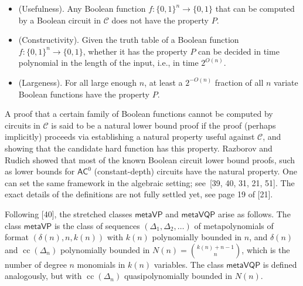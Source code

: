 \documentclass[10pt,a4paper]{article}
\begin{document}
\begin{itemize}


\item 
 


(Usefulness). Any Boolean function $f:\{0,1\}^{n}\rightarrow\{0,1\}$ that can be computed by a Boolean circuit in $\mathcal{C}$ does not have the property $P$.





\item 
 


(Constructivity). Given the truth table of a Boolean function $f:\{0,1\}^{n}\rightarrow\{0,1\}$, whether it has the property $P$ can be decided in time polynomial in the length of the input, i.e., in time $2^{O(n)}$.





\item 
 


(Largeness). For all large enough $n$, at least a $2^{-O(n)}$ fraction of all $n$ variate Boolean functions have the property $P$.





\end{itemize}





A proof that a certain family of Boolean functions cannot be computed by circuits in $\mathcal{C}$ is said to be a natural lower bound proof if the proof (perhaps implicitly) proceeds via establishing a natural property useful against $\mathcal{C}$, and showing that the candidate hard function has this property.
Razborov and Rudich showed that most of the known Boolean circuit lower bound proofs, such as lower bounds for $\mathsf{AC}^{0}$ (constant-depth) circuits have the natural property.
One can set the same framework in the algebraic setting; see [39, 40, 31, 21, 51]. The exact details of the definitions are not fully settled yet, see page 19 of [21].





Following [40], the stretched classes $\mathsf{metaVP}$ and $\mathsf{metaVQP}$ arise as follows.
The class $\mathsf{metaVP}$ is the class of sequences $(\Delta_{1},\Delta_{2},\ldots)$ of metapolynomials of format $(\delta(n),n,k(n))$ with $k(n)$ polynomially bounded in $n$, and $\delta(n)$ and $\operatorname{cc}(\Delta_{n})$ polynomially bounded in $N(n)=\binom{k(n)+n-1}{n}$, which is the number of degree $n$ monomials in $k(n)$ variables. The class $\mathsf{metaVQP}$ is defined analogously, but with $\operatorname{cc}(\Delta_{n})$ quasipolynomially bounded in $N(n)$.
\end{document}
